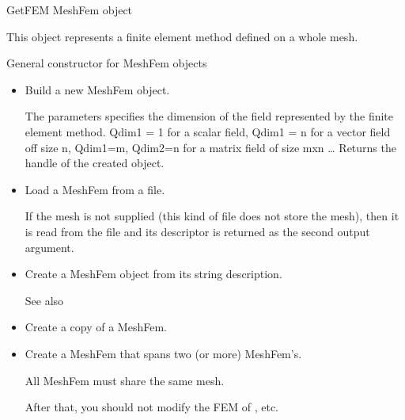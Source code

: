 \documentclass[a4paper,11pt,english]{sphinxmanual}
\begin{document}
\begin{fulllineitems}
\label{\detokenize{python/cmdref_MeshFem:getfem.MeshFem}}
GetFEM MeshFem object

This object represents a finite element method defined on a whole mesh.

General constructor for MeshFem objects
\begin{itemize}
\item {} 
Build a new MeshFem object.

The  parameters specifies the dimension of the field represented
by the finite element method. Qdim1 = 1 for a scalar field,
Qdim1 = n for a vector field off size n, Qdim1=m, Qdim2=n for
a matrix field of size mxn …
Returns the handle of the created object.

\item {} 
Load a MeshFem from a file.

If the mesh  is not supplied (this kind of file does not store the
mesh), then it is read from the file  and its descriptor is
returned as the second output argument.

\item {} 
Create a MeshFem object from its string description.

See also 

\item {} 
Create a copy of a MeshFem.

\item {} 
Create a MeshFem that spans two (or more) MeshFem’s.

All MeshFem must share the same mesh.

After that, you should not modify the FEM of ,  etc.


\end{itemize}
\end{fulllineitems}
\end{document}
